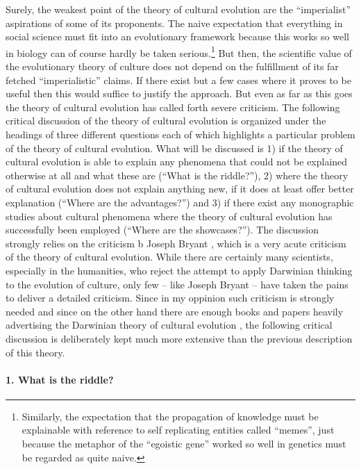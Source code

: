 \label{culturalEvolutionCriticism}
Surely, the weakest point of the theory of cultural evolution are the
``imperialist'' aspirations of some of its proponents. The naive expectation
that everything in social science must fit into an evolutionary framework
because this works so well in biology can of course hardly be taken
serious.\footnote{Similarly, the expectation that the propagation of knowledge
  must be explainable with reference to self replicating entities called
  ``memes'', just because the metaphor of the ``egoistic gene'' worked so well
  in genetics must be regarded as quite naive.} But then, the scientific value
of the evolutionary theory of culture does not depend on the fulfillment of
its far fetched ``imperialistic'' claims. If there exist but a few cases where
it proves to be useful then this would suffice to justify the approach. But
even as far as this goes the theory of cultural evolution has called forth
severe criticism. The following critical discussion of the theory of cultural
evolution is organized under the headings of three different questions each of
which highlights a particular problem of the theory of cultural evolution.
What will be discussed is 1) if the theory of cultural evolution is able to
explain any phenomena that could not be explained otherwise at all and what
these are (``What is the riddle?''), 2) where the theory of cultural evolution
does not explain anything new, if it does at least offer better explanation
(``Where are the advantages?'') and 3) if there exist any monographic studies
about cultural phenomena where the theory of cultural evolution has
successfully been employed (``Where are the showcases?''). The discussion
strongly relies on the criticism b Joseph Bryant \cite[]{bryant:2004}, which
is a very acute criticism of the theory of cultural evolution. While there are
certainly many scientists, especially in the humanities, who reject the
attempt to apply Darwinian thinking to the evolution of culture, only few --
like Joseph Bryant -- have taken the pains to deliver a detailed criticism.
Since in my oppinion such criticism is strongly needed and since on the other
hand there are enough books and papers heavily advertising the Darwinian
theory of cultural evolution \cite[]{mesoudi-laland-whiten:2006,
  laland-brown:2004, dennett:2006, dennett:1996}, the following critical
discussion is deliberately kept much more extensive than the previous
description of this theory.


\paragraph{1. What is the riddle?} 

